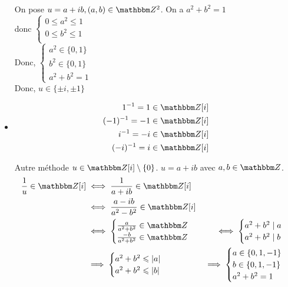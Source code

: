 \begin{itemize}
		On pose $u = a+ib, (a,b) \in \Z^2$. On a $a^2 + b^2 = 1$\\
		donc $\begin{cases}
			0 \le a^2 \le 1\\
			0 \le b^2 \le 1\\
		\end{cases}$ \\
		Donc, $\begin{cases}
			a^2 \in \{0,1\} \\
			b^2 \in \{0,1\}\\
			a^2+b^2 = 1
		\end{cases}$ \\
		Donc, $u \in \{\pm i, \pm 1\}$ \\
	\item
		\begin{align*}
			1^{-1} = 1 \in \Z[i]\\
			(-1)^{-1} = -1 \in \Z[i]\\
			i^{-1} = -i \in \Z[i]\\
			(-i)^{-1} = i \in \Z[i]\\
		\end{align*}
	\item[\sc Autre méthode] $u \in \Z[i]\setminus \{0\}$. $u = a+ib$ avec $a,b \in \Z$.\\
		\begin{align*}
			\frac{1}{u} \in \Z[i] &\iff \frac{1}{a+ib}\in \Z[i]\\
														&\iff \frac{a-ib}{a^2-b^2} \in \Z[i]\\
														&\iff \begin{cases}
															\frac{a}{a^2+b^2} \in \Z\\
															\frac{-b}{a^2+b^2} \in \Z
														\end{cases}
														&\iff \begin{cases}
															a^2+b^2 \mid a\\
															a^2+b^2 \mid b\\
														\end{cases}\\
														&\implies \begin{cases}
															a^2+b^2 \le \left| a \right|\\
															a^2+b^2 \le \left| b \right|\\
														\end{cases}
														&\implies \begin{cases}
															a \in \{0,1,-1\}\\
															b \in \{0,1,-1\}\\
															a^2 + b^2 = 1
														\end{cases}
		\end{align*}
\end{itemize}
